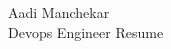 \documentclass{article}
\begin{document}
\begin{center}
    \Huge Aadi Manchekar \\
    \Large Devops Engineer Resume
\end{center}
\end{document}

